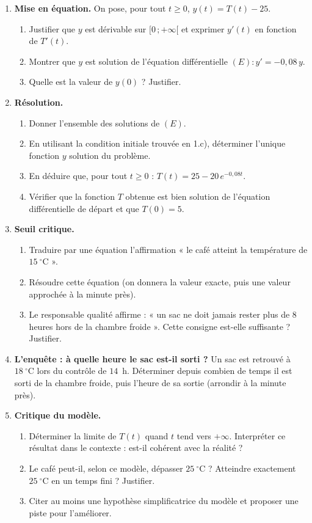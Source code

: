 \documentclass[11pt]{article}
\begin{document}
\begin{enumerate}
\item \textbf{Mise en équation.} On pose, pour tout $t \geq 0$, $y(t) = T(t) - 25$.
\begin{enumerate}
\item Justifier que $y$ est dérivable sur $[0\,; +\infty[$ et exprimer $y'(t)$ en fonction de $T'(t)$.
\item Montrer que $y$ est solution de l'équation différentielle $(E) : y' = -0{,}08\,y$.
\item Quelle est la valeur de $y(0)$ ? Justifier.
\end{enumerate}
\item \textbf{Résolution.}
\begin{enumerate}
\item Donner l'ensemble des solutions de $(E)$.
\item En utilisant la condition initiale trouvée en 1.c), déterminer l'unique fonction $y$ solution du problème.
\item En déduire que, pour tout $t \geq 0$ : $T(t) = 25 - 20\,e^{-0{,}08t}$.
\item Vérifier que la fonction $T$ obtenue est bien solution de l'équation différentielle de départ et que $T(0) = 5$.
\end{enumerate}
\item \textbf{Seuil critique.}
\begin{enumerate}
\item Traduire par une équation l'affirmation « le café atteint la température de $15~^\circ\mathrm{C}$ ».
\item Résoudre cette équation (on donnera la valeur exacte, puis une valeur approchée à la minute près).
\item Le responsable qualité affirme : « un sac ne doit jamais rester plus de 8 heures hors de la chambre froide ». Cette consigne est-elle suffisante ? Justifier.
\end{enumerate}
\item \textbf{L'enquête : à quelle heure le sac est-il sorti ?} Un sac est retrouvé à $18~^\circ\mathrm{C}$ lors du contrôle de $14$~h. Déterminer depuis combien de temps il est sorti de la chambre froide, puis l'heure de sa sortie (arrondir à la minute près).
\item \textbf{Critique du modèle.}
\begin{enumerate}
\item Déterminer la limite de $T(t)$ quand $t$ tend vers $+\infty$. Interpréter ce résultat dans le contexte : est-il cohérent avec la réalité ?
\item Le café peut-il, selon ce modèle, dépasser $25~^\circ\mathrm{C}$ ? Atteindre exactement $25~^\circ\mathrm{C}$ en un temps fini ? Justifier.
\item Citer au moins une hypothèse simplificatrice du modèle et proposer une piste pour l'améliorer.
\end{enumerate}
\end{enumerate}
\end{document}
